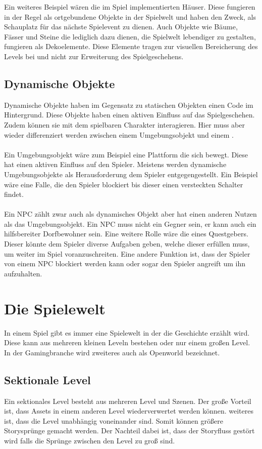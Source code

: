 Ein weiteres Beispiel wären die im Spiel implementierten Häuser. Diese fungieren in der Regel als ortgebundene Objekte in der Spielwelt und haben den Zweck, als Schauplatz für das nächste Spielevent zu dienen. Auch Objekte wie Bäume, Fässer und Steine die lediglich dazu dienen, die Spielwelt lebendiger zu gestalten, fungieren als Dekoelemente. Diese Elemente tragen zur visuellen Bereicherung des Levels bei und nicht zur Erweiterung des Spielgeschehens. 


\subsection{Dynamische Objekte}
Dynamische Objekte haben im Gegensatz zu statischen Objekten einen Code im Hintergrund. Diese Objekte haben einen aktiven Einfluss auf das Spielgeschehen. Zudem können sie mit dem spielbaren Charakter interagieren. Hier muss aber wieder differenziert werden zwischen einem Umgebungsobjekt und einem .\\\\
Ein Umgebungsobjekt wäre zum Beispiel eine Plattform die sich bewegt. Diese hat einen aktiven Einfluss auf den Spieler. Meistens werden dynamische Umgebungsobjekte als Herausforderung dem Spieler entgegengestellt. Ein Beispiel wäre eine Falle, die den Spieler blockiert bis dieser einen versteckten Schalter findet. 
\\\\
Ein NPC zählt zwar auch als dynamisches Objekt aber hat einen anderen Nutzen als das Umgebungsobjekt. Ein NPC muss nicht ein Gegner sein, er kann auch ein hilfsbereiter Dorfbewohner sein. Eine weitere Rolle wäre die eines Questgebers. Dieser könnte dem Spieler diverse Aufgaben geben, welche dieser erfüllen muss, um weiter im Spiel voranzuschreiten. Eine andere Funktion ist, dass der Spieler von einem NPC blockiert werden kann oder sogar den Spieler angreift um ihn aufzuhalten.

\pagebreak

\section{Die Spielewelt}
In einem Spiel gibt es immer eine Spielewelt in der die Geschichte erzählt wird. Diese kann aus mehreren kleinen Leveln bestehen oder nur einem großen Level. In der Gamingbranche wird zweiteres auch als Openworld bezeichnet.


\subsection {Sektionale Level}
Ein sektionales Level besteht aus mehreren Level und Szenen. Der große Vorteil ist, dass Assets in einem anderen Level wiederverwertet werden können. weiteres ist, dass die Level unabhängig voneinander sind. Somit können größere Storysprünge gemacht werden. Der Nachteil dabei ist, dass der Storyfluss  gestört wird falls die Sprünge zwischen den Level zu groß sind. 

